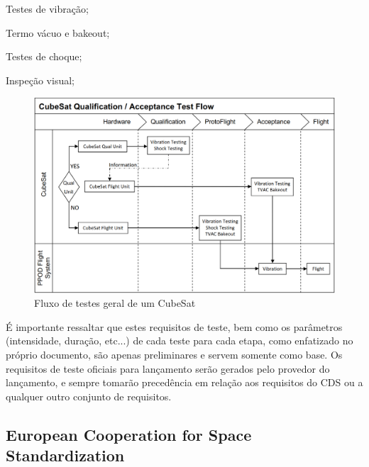 \vspace{1mm}
\begin{alineas}
    \item Testes de vibração;
    \item Termo vácuo e bakeout;
    \item Testes de choque;
    \item Inspeção visual;
\end{alineas}
\vspace{3mm}

\begin{figure}[htp]
    \caption{Fluxo de testes geral de um CubeSat}
    \begin{center}
        \includegraphics[width=\textwidth, keepaspectratio]{images/test-flow-diagram-cds.png}
    \end{center}
    \label{fig:test-flow-cds}
\end{figure}


É importante ressaltar que estes requisitos de teste, bem como os parâmetros (intensidade, duração, etc...) de cada teste para cada etapa, como enfatizado no próprio documento, são apenas preliminares e servem somente como base. Os requisitos de teste oficiais para lançamento serão gerados pelo provedor do lançamento, e sempre tomarão precedência em relação aos requisitos do \gls{CDS} ou a qualquer outro conjunto de requisitos.


\subsection{European Cooperation for Space Standardization}

